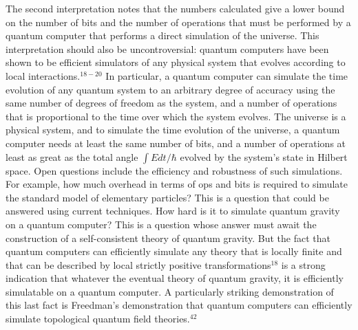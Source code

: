 The second interpretation notes that the numbers calculated give a lower
bound on the number of bits and the number of operations that must be performed 
by a quantum computer that performs a direct simulation of the universe.
This interpretation should also be uncontroversial: quantum computers
have been shown to be efficient simulators of any physical system that
evolves according to local interactions.$^{18-20}$  
In particular, a quantum computer
can simulate the time evolution of any quantum system to an arbitrary
degree of accuracy using the same number
of degrees of freedom as the system, and a number of operations that is
proportional to the time over which the system evolves.  The universe is
a physical system, and to simulate the time evolution of the universe,
a quantum computer needs at least the same number of bits, 
and a number of operations
at least as great as the total angle $\int E dt/\hbar$ evolved by the 
system's state in Hilbert space.  Open questions include the efficiency
and robustness of such simulations.  For example, how much overhead in
terms of ops and bits is required to simulate the standard model of
elementary particles?  This is a question that could be answered using
current techniques.  How hard is it to simulate quantum gravity on a quantum
computer?  This is a question whose answer must await the construction
of a self-consistent theory of quantum gravity.  But the fact that quantum
computers can efficiently simulate any theory that is locally finite
and that can be described by local strictly positive transformations$^{18}$
is a strong indication that whatever the eventual theory of quantum gravity,
it is efficiently simulatable on a quantum computer.  A particularly 
striking demonstration of this last fact is Freedman's demonstration
that quantum computers can efficiently simulate topological quantum
field theories.$^{42}$

